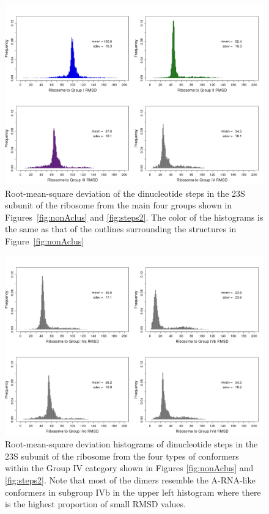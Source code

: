 \begin{figure}[htbp]
 \centering
\includegraphics[angle=90, scale=0.5]{Chapter2/RMSDschneider1.png}
\caption{Root-mean-square deviation  of the dinucleotide  steps in the
23S  subunit  of the  ribosome  from the  main  four  groups shown  in
Figures~\ref{fig:nonAclus}  and  \ref{fig:steps2}.  The color  of  the
histograms  is  the same  as  that  of  the outlines  surrounding  the
structures in Figure~\ref{fig:nonAclus}}
 \label{fig:histo1}
\end{figure}

\begin{figure}[htbp]
 \centering
\includegraphics[angle=90, scale=0.5]{Chapter2/RMSDschneider2.png}
\caption{Root-mean-square  deviation histograms of  dinucleotide steps
in the 23S  subunit of the ribosome from the  four types of conformers
within the  Group IV category shown in  Figures \ref{fig:nonAclus} and
\ref{fig:steps2}. Note that most of the dimers resemble the A-RNA-like
conformers in subgroup IVb in  the upper left histogram where there is
the highest proportion of small RMSD values.}
 \label{fig:histo2}
\end{figure}

